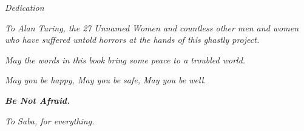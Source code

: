 \newpage
\thispagestyle{empty}

\vspace*{\fill}

\begin{center}
{\Large\itshape Dedication}
\end{center}

\vspace{2cm}

\begin{center}
\textit{To Alan Turing, the 27 Unnamed Women and countless other men and women who have suffered untold horrors at the hands of this ghastly project.}

\vspace{1cm}

\textit{May the words in this book bring some peace to a troubled world.}

\vspace{1cm}

\textit{May you be happy, May you be safe, May you be well.}

\vspace{1cm}

\textbf{\textit{Be Not Afraid.}}

\vspace{2cm}

\textit{To Saba, for everything.}
\end{center}

\vspace*{\fill}

\newpage

